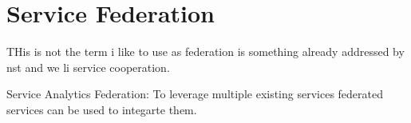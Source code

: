
\section{Service Federation}
\label{sec:federation}

THis is not the term i like to use as federation is something already addressed by nst and we li service cooperation.





Service Analytics Federation: To leverage multiple
existing services federated services can be used to integarte them.
